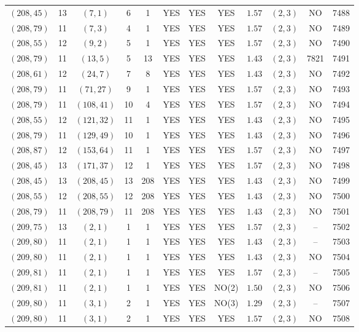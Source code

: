 \begin{longtable}{|c|c|c|c|c|c|c|c|c|c|c|c|}
$(208,45)$ & 13 & $(7,1)$ & 6 & 1 & YES & YES & YES & $1.57$ & $(2,3)$ & NO & 7488\\
$(208,79)$ & 11 & $(7,3)$ & 4 & 1 & YES & YES & YES & $1.57$ & $(2,3)$ & NO & 7489\\
$(208,55)$ & 12 & $(9,2)$ & 5 & 1 & YES & YES & YES & $1.57$ & $(2,3)$ & NO & 7490\\
$(208,79)$ & 11 & $(13,5)$ & 5 & 13 & YES & YES & YES & $1.43$ & $(2,3)$ & 7821 & 7491\\
$(208,61)$ & 12 & $(24,7)$ & 7 & 8 & YES & YES & YES & $1.43$ & $(2,3)$ & NO & 7492\\
$(208,79)$ & 11 & $(71,27)$ & 9 & 1 & YES & YES & YES & $1.57$ & $(2,3)$ & NO & 7493\\
$(208,79)$ & 11 & $(108,41)$ & 10 & 4 & YES & YES & YES & $1.57$ & $(2,3)$ & NO & 7494\\
$(208,55)$ & 12 & $(121,32)$ & 11 & 1 & YES & YES & YES & $1.43$ & $(2,3)$ & NO & 7495\\
$(208,79)$ & 11 & $(129,49)$ & 10 & 1 & YES & YES & YES & $1.43$ & $(2,3)$ & NO & 7496\\
$(208,87)$ & 12 & $(153,64)$ & 11 & 1 & YES & YES & YES & $1.57$ & $(2,3)$ & NO & 7497\\
$(208,45)$ & 13 & $(171,37)$ & 12 & 1 & YES & YES & YES & $1.57$ & $(2,3)$ & NO & 7498\\
$(208,45)$ & 13 & $(208,45)$ & 13 & 208 & YES & YES & YES & $1.43$ & $(2,3)$ & NO & 7499\\
$(208,55)$ & 12 & $(208,55)$ & 12 & 208 & YES & YES & YES & $1.43$ & $(2,3)$ & NO & 7500\\
$(208,79)$ & 11 & $(208,79)$ & 11 & 208 & YES & YES & YES & $1.43$ & $(2,3)$ & NO & 7501\\
$(209,75)$ & 13 & $(2,1)$ & 1 & 1 & YES & YES & YES & $1.57$ & $(2,3)$ & -- & 7502\\
$(209,80)$ & 11 & $(2,1)$ & 1 & 1 & YES & YES & YES & $1.43$ & $(2,3)$ & -- & 7503\\
$(209,80)$ & 11 & $(2,1)$ & 1 & 1 & YES & YES & YES & $1.43$ & $(2,3)$ & NO & 7504\\
$(209,81)$ & 11 & $(2,1)$ & 1 & 1 & YES & YES & YES & $1.57$ & $(2,3)$ & -- & 7505\\
$(209,81)$ & 11 & $(2,1)$ & 1 & 1 & YES & YES & NO(2) & $1.50$ & $(2,3)$ & NO & 7506\\
$(209,80)$ & 11 & $(3,1)$ & 2 & 1 & YES & YES & NO(3) & $1.29$ & $(2,3)$ & -- & 7507\\
$(209,80)$ & 11 & $(3,1)$ & 2 & 1 & YES & YES & YES & $1.57$ & $(2,3)$ & NO & 7508\\

\end{longtable}
